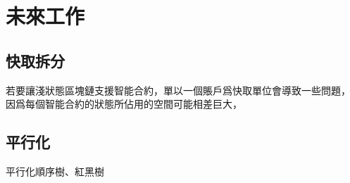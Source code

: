 \chapter{未來工作}
\label{c:future_work}

\section{快取拆分}

若要讓淺狀態區塊鏈支援智能合約，單以一個賬戶爲快取單位會導致一些問題，
因爲每個智能合約的狀態所佔用的空間可能相差巨大，

\section{平行化}
平行化順序樹、紅黑樹